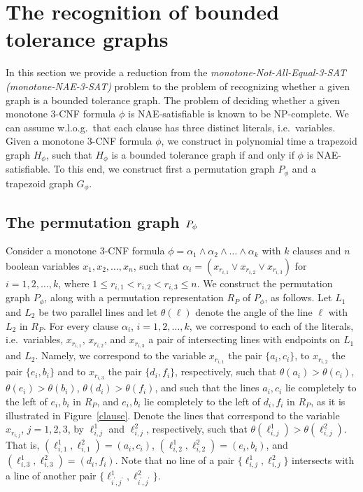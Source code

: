 \documentclass[proceedings]{stacs}
\begin{document}
\section{The recognition of bounded tolerance graphs\label{bounded}}

In this section we provide a reduction from the 
\emph{monotone-Not-All-Equal-3-SAT (monotone-NAE-3-SAT)} problem 
to the problem of recognizing whether a given graph is a bounded tolerance graph. 
The problem of deciding whether a given monotone 3-CNF formula $\phi $ is 
NAE-satisfiable is known to be NP-complete. We can assume w.l.o.g.~that 
each clause has three distinct literals, i.e.~variables. Given a monotone 
3-CNF formula $\phi$, we construct in polynomial time a trapezoid graph $H_{\phi}$, 
such that $H_{\phi }$ is a bounded tolerance graph if and only if $\phi$ 
is NAE-satisfiable. To this end, we construct first a permutation graph 
$P_{\phi}$ and a trapezoid graph $G_{\phi}$.

\subsection{The permutation graph $P_{\protect\phi }$\label{P}}

Consider a monotone 3-CNF formula ${\phi =\alpha _{1}\wedge \alpha
_{2}\wedge \ldots \wedge \alpha _{k}}$ with $k$ clauses and $n$ boolean
variables ${x_{1},x_{2},\ldots ,x_{n}}$, such that ${\alpha
_{i}=(x_{r_{i,1}}\vee x_{r_{i,2}}\vee x_{r_{i,3}})}$ for ${i=1,2,\ldots ,k}$, 
where ${1\leq r_{i,1}<r_{i,2}<r_{i,3}\leq n}$. We construct the
permutation graph $P_{\phi }$, along with a permutation representation $R_{P}$ 
of $P_{\phi }$, as follows. Let $L_{1}$ and $L_{2}$ be two parallel lines
and let $\theta (\ell )$ denote the angle of the line $\ell $ with $L_{2}$
in $R_{P}$. For every clause $\alpha _{i}$, ${i=1,2,\ldots ,k}$, we
correspond to each of the literals, i.e.~variables, $x_{r_{i,1}}$, 
$x_{r_{i,2}}$, and $x_{r_{i,3}}$ a pair of intersecting lines with 
endpoints on $L_{1}$ and $L_{2}$. 
Namely, we correspond to the variable $x_{r_{i,1}}$ the pair $\{{a_{i},c_{i}\}}$, 
to $x_{r_{i,2}}$ the pair $\{{e_{i},b_{i}\}}$ 
and to $x_{r_{i,3}}$ the pair $\{{d_{i},f_{i}\}}$, respectively, such that 
${\theta (a_{i})>\theta (c_{i})}$, 
${\theta (e_{i})>\theta (b_{i})}$, 
${\theta (d_{i})>\theta (f_{i})}$, and such that the lines 
${a_{i},c_{i}}$ lie completely to the left of ${e_{i},b_{i}}$ in $R_{P}$, and 
${e_{i},b_{i}}$ lie completely to the left of ${d_{i},f_{i}}$ in $R_{P}$, 
as it is illustrated in Figure~\ref{clause}. 
Denote the lines that correspond to the
variable $x_{r_{i,j}}$, $j=1,2,3$, by $\ell _{i,j}^{1} $ and $\ell _{i,j}^{2}
$, respectively, such that ${\theta (\ell _{i,j}^{1})>\theta (\ell
_{i,j}^{2})}$. That is, $(\ell _{i,1}^{1},\ell _{i,1}^{2})=(a_{i},c_{i})$, $%
(\ell _{i,2}^{1},\ell _{i,2}^{2})=(e_{i},b_{i})$, and $(\ell _{i,3}^{1},\ell
_{i,3}^{2})=(d_{i},f_{i})$. Note that no line of a pair $\{\ell
_{i,j}^{1},\ell _{i,j}^{2}\}$ intersects with a line of another pair $\{\ell
_{i^{\prime },j^{\prime }}^{1},\ell _{i^{\prime },j^{\prime }}^{2}\}$.
\end{document}
